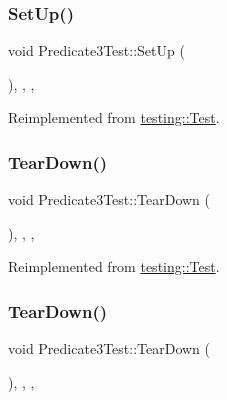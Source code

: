 \mbox{\label{class_predicate3_test_a4f70b241201bac1bfee5d159702188b4}} 
\subsubsection{\texorpdfstring{SetUp()}{SetUp()}\hspace{0.1cm}{\footnotesize\ttfamily [3/3]}}
{\footnotesize\ttfamily void Predicate3\+Test\+::\+Set\+Up (\begin{DoxyParamCaption}{ }\end{DoxyParamCaption})\hspace{0.3cm}{\ttfamily [inline]}, {\ttfamily [override]}, {\ttfamily [protected]}, {\ttfamily [virtual]}}



Reimplemented from \mbox{\hyperlink{classtesting_1_1_test_a190315150c303ddf801313fd1a777733}{testing\+::\+Test}}.

\mbox{\label{class_predicate3_test_a502f4426fc9f90991a7aadbb304794e6}} 
\subsubsection{\texorpdfstring{TearDown()}{TearDown()}\hspace{0.1cm}{\footnotesize\ttfamily [1/3]}}
{\footnotesize\ttfamily void Predicate3\+Test\+::\+Tear\+Down (\begin{DoxyParamCaption}{ }\end{DoxyParamCaption})\hspace{0.3cm}{\ttfamily [inline]}, {\ttfamily [override]}, {\ttfamily [protected]}, {\ttfamily [virtual]}}



Reimplemented from \mbox{\hyperlink{classtesting_1_1_test_a5f0ab439802cbe0ef7552f1a9f791923}{testing\+::\+Test}}.

\mbox{\label{class_predicate3_test_a502f4426fc9f90991a7aadbb304794e6}} 
\subsubsection{\texorpdfstring{TearDown()}{TearDown()}\hspace{0.1cm}{\footnotesize\ttfamily [2/3]}}
{\footnotesize\ttfamily void Predicate3\+Test\+::\+Tear\+Down (\begin{DoxyParamCaption}{ }\end{DoxyParamCaption})\hspace{0.3cm}{\ttfamily [inline]}, {\ttfamily [override]}, {\ttfamily [protected]}, {\ttfamily [virtual]}}



